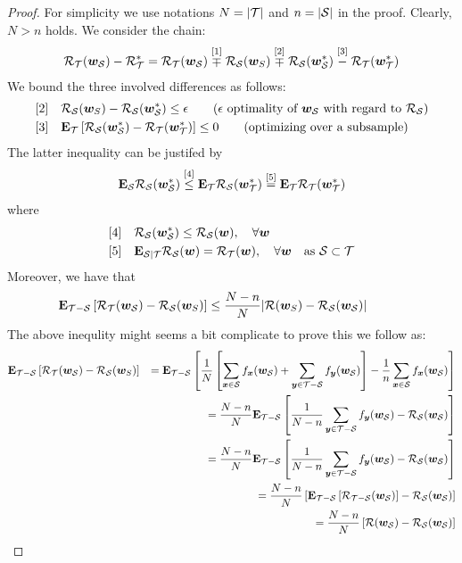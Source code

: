 \documentclass{article}
\begin{document}
\begin{proof}
For simplicity we use notations $N = | \T |$ and $n = | \S |$ in the proof.
Clearly, $N > n$ holds. We consider the chain:
\begin{align}
\risk_\T(\w_\S) - \risk_\T^* = \risk_\T(\w_\S) \stackrel{[1]}{\mp} \risk_\S(\w_S) \stackrel{[2]}{\mp} \risk_\S(\w_\S^*) \stackrel{[3]}{-} \risk_\T(\w_\T^*)
\end{align}
We bound the three involved differences as follows: 
\begin{align}
\text{[2]} \quad & \risk_\S(\w_S)  - \risk_\S(\w_\S^*) \le \epsilon  \qquad 
\text{($\epsilon$ optimality of $\w_\S$ with regard to $\risk_\S$)}
\\
\text{[3]} \quad & \E_\T \left[ \risk_\S(\w_\S^*) - \risk_\T(\w_\T^*) \right] \le 0 \qquad 
\text{(optimizing over a subsample)}
\end{align}
The latter inequality can be justifed by
\begin{align}
\E_{\S} \risk_\S(\w_\S^*) \stackrel{[4]}{\le} \E_{\T} \risk_\S(\w_\T^*)  \stackrel{[5]}= \E_{\T} \risk_\T(\w_\T^*)  
\end{align}
where 
\begin{align}
\text{[4]} \quad & \risk_\S(\w_\S^*) \le \risk_\S(\w), \quad \forall \w\\
\text{[5]} \quad & \E_{\S | \T} \risk_\S(\w) = \risk_\T(\w), \quad \forall \w \quad \text{as $\S \subset \T$}
\end{align}
Moreover, we have that
\begin{align}
& \E_{\T-\S} \left[ \risk_\T(\w_\S) - \risk_\S(\w_S) \right] \le \frac{N- n}{N} | \risk(\w_S) - \risk_\S(\w_\S) |
\label{eq:t-s} \qquad 
\end{align}
The above inequlity might seems a bit complicate to prove this we follow as: 
\begin{eqnarray*}
  & \E_{\T-\S} \left[ \risk_\T(\w_\S) - \risk_\S(\w_S) \right] & = \E_{\T-\S}
  \left[
  \frac{1}{N} \left[  \sum_{\x \in \S} f_{\x}(\w_\S)  + \sum_{\y \in \T - \S}
  f_{\y}(\w_\S)\right] - \frac{1}{n}  \sum_{\x \in \S} f_{\x}(\w_\S)  \right]\\
  & & =  
  \frac{N-n}{N} \E_{\T-\S} \left[ \frac{1}{N-n} \sum_{\y \in \T - \S}
  f_{\y}(\w_\S) -  \risk_\S(\w_{\S}) \right] \\
  & & = \frac{N-n}{N} \E_{\T-\S} \left[ \frac{1}{N-n} \sum_{\y \in \T - \S}
  f_{\y}(\w_\S) -  \risk_\S(\w_{\S}) \right]\\ 
  & &  = \frac{N-n}{N}\left[ \E_{\T-\S} \left[ \risk_{\T-\S}(\w_\S) \right]-
  \risk_\S(\w_{\S}) \right] \\ 
  & & = \frac{N-n}{N} \left[\risk(\w_{\S}) - \risk_\S(\w_{\S})\right]
\end{eqnarray*}


\end{proof}
\end{document}
